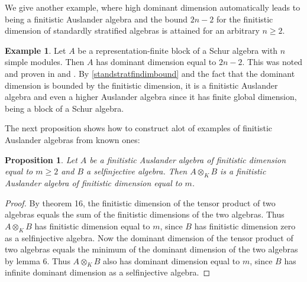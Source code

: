 \documentclass[a4paper]{amsart}
\newtheorem{proposition}[theorem]{Proposition}
\theoremstyle{definition}
\newtheorem{example}[theorem]{Example}
\theoremstyle{remark}
\numberwithin{equation}{theorem}
\begin{document}
We give another example, where high dominant dimension automatically leads to being a finitistic Auslander algebra and the bound $2n-2$ for the finitistic dimension of standardly stratified algebras is attained for an arbitrary $n \geq 2$.
\begin{example}
Let $A$ be a representation-finite block of a Schur algebra with $n$ simple modules. Then $A$ has dominant dimension equal to $2n-2$. This was noted and proven in \cite{ChMar} and \cite{Mar}. By \ref{standstratfindimbound} and the fact that the dominant dimension is bounded by the finitistic dimension, it is a finitistic Auslander algebra and even a higher Auslander algebra since it has finite global dimension, being a block of a Schur algebra.
\end{example}

The next proposition shows how to construct alot of examples of finitistic Auslander algebras from known ones:
\begin{proposition}
Let $A$ be a finitistic Auslander algebra of finitistic dimension equal to $m \geq 2$ and $B$ a selfinjective algebra.
Then $A \otimes_K B$ is a finitistic Auslander algebra of finitistic dimension equal to $m$.

\end{proposition}
\begin{proof}
By \cite{ERZ} theorem 16, the finitistic dimension of the tensor product of two algebras equals the sum of the finitistic dimensions of the two algebras. Thus $A \otimes_K B$ has finitistic dimension equal to $m$, since $B$ has finitistic dimension zero as a selfinjective algebra. Now the dominant dimension of the tensor product of two algebras equals the minimum of the dominant dimension of the two algebras by \cite{Mue} lemma 6.
Thus $A \otimes_K B$ also has dominant dimension equal to $m$, since $B$ has infinite dominant dimension as a selfinjective algebra.
\end{proof}
\end{document}
